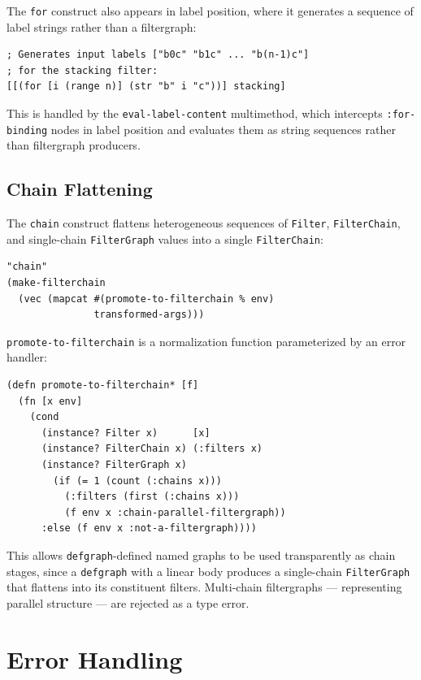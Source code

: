 \documentclass[conference]{IEEEtran}
\begin{document}
The \texttt{for} construct also appears in label position, where it generates a sequence of label strings rather than a filtergraph:

\begin{lstlisting}[caption={for in label position}]
; Generates input labels ["b0c" "b1c" ... "b(n-1)c"]
; for the stacking filter:
[[(for [i (range n)] (str "b" i "c"))] stacking]
\end{lstlisting}

This is handled by the \texttt{eval-label-content} multimethod, which intercepts \texttt{:for-binding} nodes in label position and evaluates them as string sequences rather than filtergraph producers.

\subsection{Chain Flattening}

The \texttt{chain} construct flattens heterogeneous sequences of \texttt{Filter}, \texttt{FilterChain}, and single-chain \texttt{FilterGraph} values into a single \texttt{FilterChain}:

\begin{lstlisting}[caption={chain flattening via promote-to-filterchain}]
"chain"
(make-filterchain
  (vec (mapcat #(promote-to-filterchain % env)
               transformed-args)))
\end{lstlisting}

\texttt{promote-to-filterchain} is a normalization function parameterized by an error handler:

\begin{lstlisting}[caption={promote-to-filterchain* factory}]
(defn promote-to-filterchain* [f]
  (fn [x env]
    (cond
      (instance? Filter x)      [x]
      (instance? FilterChain x) (:filters x)
      (instance? FilterGraph x)
        (if (= 1 (count (:chains x)))
          (:filters (first (:chains x)))
          (f env x :chain-parallel-filtergraph))
      :else (f env x :not-a-filtergraph))))
\end{lstlisting}

This allows \texttt{defgraph}-defined named graphs to be used transparently as chain stages, since a \texttt{defgraph} with a linear body produces a single-chain \texttt{FilterGraph} that flattens into its constituent filters. Multi-chain filtergraphs --- representing parallel structure --- are rejected as a type error.

\section{Error Handling}
\end{document}
